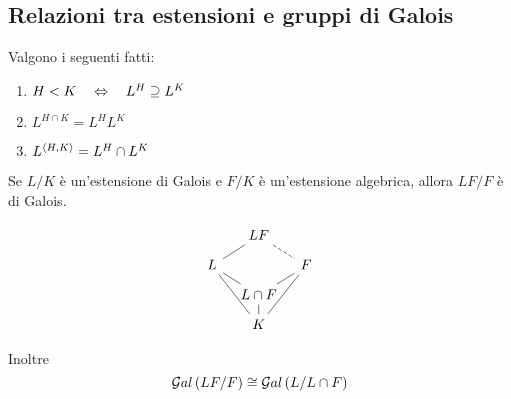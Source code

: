 \subsection{Relazioni tra estensioni e gruppi di Galois}
\begin{multicols}{2}
	\begin{prop}
		Valgono i seguenti fatti:
		\begin{enumerate}
			\item  $ H < K \quad\Leftrightarrow\quad L^H \supseteq L^K $
			\item $ L^{H \cap K} = L^H L^K $
			\item $ L^{\langle H, K \rangle} = L^H \cap L^K $
		\end{enumerate}
		
	\end{prop}
	
	\begin{theorem}\label{galrandom}
		Se $ L/K $ è un'estensione di Galois e $ F/K $ è un'estensione algebrica, allora $ LF/F $ è di Galois. 
		
		\[\begin{tikzcd}[row sep=0.25cm, column sep=0.3cm]
		 & LF \arrow[dl,-] \arrow[dr,-, dashed] &  \\
		L \arrow[ddr,-] \arrow[dr,-] &  & F \arrow [ddl,-] \\
		& L\cap F \arrow[ur,-] \arrow[d,-]  & \\
		& K &
		\end{tikzcd} \]
		
		Inoltre
		\[ \mathcal{G}al\left( LF/F \right) \cong \mathcal{G}al\left( L / L\cap F \right) \]
	\end{theorem}
	

\end{multicols}
